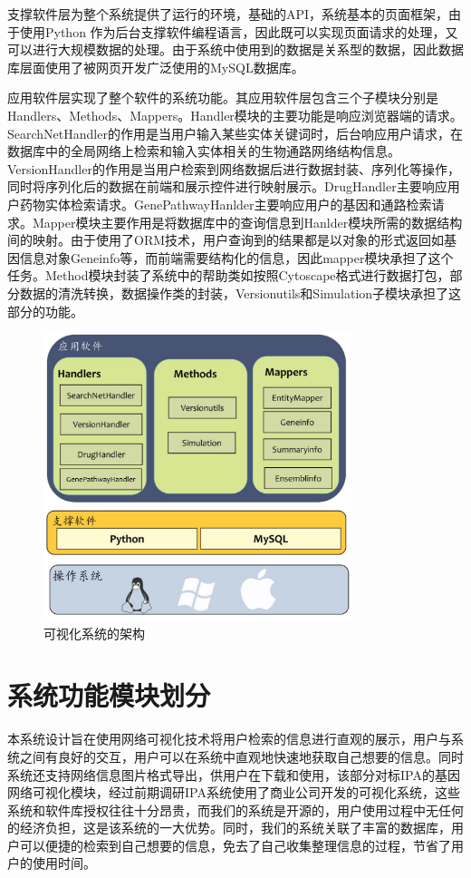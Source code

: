 支撑软件层为整个系统提供了运行的环境，基础的API，系统基本的页面框架，由于使用Python 作为后台支撑软件编程语言，因此既可以实现页面请求的处理，又可以进行大规模数据的处理。由于系统中使用到的数据是关系型的数据，因此数据库层面使用了被网页开发广泛使用的MySQL数据库。

应用软件层实现了整个软件的系统功能。其应用软件层包含三个子模块分别是Handlers、Methods、Mappers。Handler模块的主要功能是响应浏览器端的请求。SearchNetHandler的作用是当用户输入某些实体关键词时，后台响应用户请求，在数据库中的全局网络上检索和输入实体相关的生物通路网络结构信息。VersionHandler的作用是当用户检索到网络数据后进行数据封装、序列化等操作，同时将序列化后的数据在前端和展示控件进行映射展示。DrugHandler主要响应用户药物实体检索请求。GenePathwayHanlder主要响应用户的基因和通路检索请求。Mapper模块主要作用是将数据库中的查询信息到Hanlder模块所需的数据结构间的映射。由于使用了ORM技术，用户查询到的结果都是以对象的形式返回如基因信息对象Geneinfo等，而前端需要结构化的信息，因此mapper模块承担了这个任务。Method模块封装了系统中的帮助类如按照Cytoscape格式进行数据打包，部分数据的清洗转换，数据操作类的封装，Versionutils和Simulation子模块承担了这部分的功能。
\begin{figure}[h]
\centering
\includegraphics[width = 0.8\textwidth]{framework}
\caption[fig31]{可视化系统的架构}
\label{fig31}
\end{figure}

\section{系统功能模块划分}
本系统设计旨在使用网络可视化技术将用户检索的信息进行直观的展示，用户与系统之间有良好的交互，用户可以在系统中直观地快速地获取自己想要的信息。同时系统还支持网络信息图片格式导出，供用户在下载和使用，该部分对标IPA的基因网络可视化模块，经过前期调研IPA系统使用了商业公司开发的可视化系统，这些系统和软件库授权往往十分昂贵，而我们的系统是开源的，用户使用过程中无任何的经济负担，这是该系统的一大优势。同时，我们的系统关联了丰富的数据库，用户可以便捷的检索到自己想要的信息，免去了自己收集整理信息的过程，节省了用户的使用时间。

